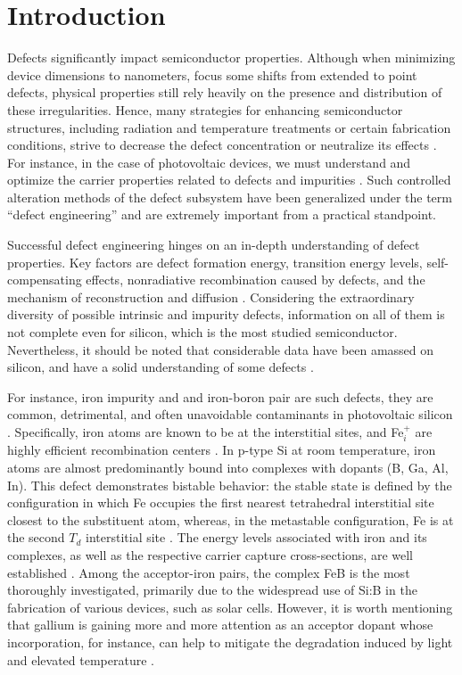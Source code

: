 \documentclass{WileyMSP-template}
\begin{document}
\section{Introduction}

Defects significantly impact semiconductor properties.
Although when minimizing device dimensions to nanometers, focus some shifts from extended to point defects,
physical properties still rely heavily on the presence and distribution of these irregularities.
Hence, many strategies for enhancing semiconductor structures, including radiation and temperature treatments or certain fabrication conditions, strive to decrease the defect concentration or neutralize its effects \cite{Cai2023,Vobecky2021,Frascaroli2021}.
For instance, in the case of photovoltaic devices, we must understand and optimize the carrier properties related to defects and impurities  \cite{Cai2023}.
Such controlled alteration methods of the defect subsystem have been generalized under the term ``defect engineering'' and are extremely important from a practical standpoint.

Successful defect engineering hinges on an in-depth understanding of defect properties.
Key factors are defect formation energy, transition energy levels, self-compensating effects, nonradiative recombination caused by defects,
and the mechanism of reconstruction and diffusion  \cite{Cai2023}.
Considering the extraordinary diversity of possible intrinsic and impurity defects, information on all of them is not complete even for silicon, which is the most studied semiconductor.
Nevertheless, it should be noted that considerable data have been amassed on silicon, and have a solid understanding of some defects \cite{Juhl2018}.

For instance, iron impurity and and iron-boron pair are such defects, they are common, detrimental, and often unavoidable contaminants in photovoltaic silicon \cite{Frascaroli2021,Sun2021}.
Specifically, iron atoms are known to be at the interstitial sites, and Fe$_i^+$ are highly efficient recombination centers \cite{WeberFe}.
In p-type Si at room temperature, iron atoms are almost predominantly bound into complexes with dopants (B, Ga, Al, In).
This defect demonstrates bistable behavior: the stable state is defined by the configuration in which Fe occupies
the first nearest tetrahedral interstitial site closest to the substituent atom,
whereas, in the metastable configuration, Fe is at the second $T_d$ interstitial site \cite{FeB:PhysRevB49}.
The energy levels associated with iron and its complexes, as well as the respective carrier capture cross-sections, are well established \cite{Juhl2018,ROUGIEUX2018}.
Among the acceptor-iron pairs, the complex FeB is the most thoroughly investigated,
primarily due to the widespread use of Si:B in the fabrication of various devices, such as solar cells.
However, it is worth mentioning that gallium is gaining more and more attention as an acceptor dopant whose incorporation,
for instance, can help to mitigate the degradation induced by light and elevated temperature \cite{Ning2022}.
\end{document}
